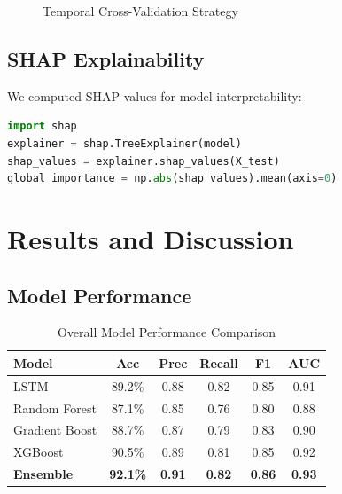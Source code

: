 \documentclass[conference,11pt]{IEEEtran}
\begin{document}
\begin{figure}[h]
\centering
{}
\caption{Temporal Cross-Validation Strategy}
\end{figure}

\subsection{SHAP Explainability}

We computed SHAP values for model interpretability:

\begin{lstlisting}[language=Python]
import shap
explainer = shap.TreeExplainer(model)
shap_values = explainer.shap_values(X_test)
global_importance = np.abs(shap_values).mean(axis=0)
\end{lstlisting}

\section{Results and Discussion}

\subsection{Model Performance}

\begin{table}[h]
\centering
\caption{Overall Model Performance Comparison}
\begin{tabular}{|l|c|c|c|c|c|}
\hline
\textbf{Model} & \textbf{Acc} & \textbf{Prec} & \textbf{Recall} & \textbf{F1} & \textbf{AUC} \\
\hline
LSTM & 89.2\% & 0.88 & 0.82 & 0.85 & 0.91 \\
\hline
Random Forest & 87.1\% & 0.85 & 0.76 & 0.80 & 0.88 \\
\hline
Gradient Boost & 88.7\% & 0.87 & 0.79 & 0.83 & 0.90 \\
\hline
XGBoost & 90.5\% & 0.89 & 0.81 & 0.85 & 0.92 \\
\hline
\textbf{Ensemble} & \textbf{92.1\%} & \textbf{0.91} & \textbf{0.82} & \textbf{0.86} & \textbf{0.93} \\
\hline
\end{tabular}
\end{table}
\end{document}
